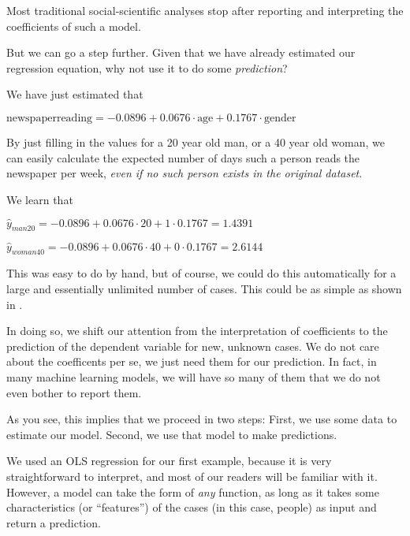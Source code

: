 Most traditional social-scientific analyses stop after reporting and interpreting
the coefficients of such a model.

But we can go a step further. Given that we have already estimated our
regression equation, why not use it to do some \emph{prediction}?

We have just estimated that

$\textrm{newspaperreading} = -0.0896 + 0.0676 \cdot \textrm{age} + 0.1767 \cdot \textrm{gender}$

By just filling in the values for a 20 year old man, or a 40 year old woman,
we can easily calculate the expected number of days such a person reads
the newspaper per week, \emph{even if no such person exists in the original dataset}.

We learn that

$\hat{y}_{man20} = -0.0896 + 0.0676 \cdot 20 + 1 \cdot 0.1767 = 1.4391$

$\hat{y}_{woman40} = -0.0896 + 0.0676 \cdot 40 + 0 \cdot 0.1767 = 2.6144$

This was easy to do by hand, but of course, we could do this automatically for a
large and essentially unlimited number of cases.
This could be as simple as shown in .


In doing so, we shift our attention from the interpretation of coefficients to
the prediction of the dependent variable for new, unknown cases. We do not
care about the coefficents per se, we just need them for our prediction.
In fact, in many machine learning models, we will have so many of them that
we do not even bother to report them.

As you see, this implies that we proceed in two steps: First, we use some data
to estimate our model. Second, we use that model to make predictions.

We used an OLS regression for our first example, because it is very straightforward
to interpret, and most of our readers will be familiar with it.
However, a model can take the form of \emph{any} function, as long as it takes
some characteristics (or ``features'') of the cases (in this case, people) as
input and return a prediction.

